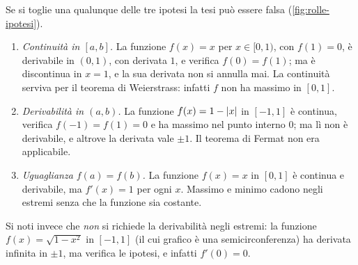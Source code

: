 \begin{osservazione}
\label{oss:rolle-ipotesi}
Se si toglie una qualunque delle tre ipotesi la tesi può essere falsa
(\cref{fig:rolle-ipotesi}).
\begin{enumerate}[label=\textup{(\alph*)}]
  \item \emph{Continuità in $[a,b]$.} La funzione $f(x)=x$ per $x\in[0,1)$, con
  $f(1)=0$, è derivabile in $(0,1)$, con derivata $1$, e verifica $f(0)=f(1)$; ma è
  discontinua in $x=1$, e la sua derivata non si annulla mai. La continuità serviva per
  il teorema di Weierstrass: infatti $f$ non ha massimo in $[0,1]$.
  \item \emph{Derivabilità in $(a,b)$.} La funzione $f(x)=1-\lvert x\rvert$ in $[-1,1]$ è
  continua, verifica $f(-1)=f(1)=0$ e ha massimo nel punto interno $0$; ma lì non è
  derivabile, e altrove la derivata vale $\pm1$. Il teorema di Fermat non era
  applicabile.
  \item \emph{Uguaglianza $f(a)=f(b)$.} La funzione $f(x)=x$ in $[0,1]$ è continua e
  derivabile, ma $f'(x)=1$ per ogni $x$. Massimo e minimo cadono negli estremi senza che
  la funzione sia costante.
\end{enumerate}
Si noti invece che \emph{non} si richiede la derivabilità negli estremi: la funzione
$f(x)=\sqrt{1-x^{2}}$ in $[-1,1]$ (il cui grafico è una semicirconferenza) ha
derivata infinita in $\pm1$, ma verifica le ipotesi, e infatti $f'(0)=0$.
\end{osservazione}

